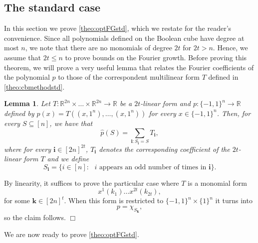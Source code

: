 \documentclass[11pt]{article}
\newcommand{\R}{\mathbb{R}} %
\newcommand{\1}{\mathbf{1}}
\newcommand{\ind}[1]{\mathbf{#1}}
\theoremstyle{plain}
\newtheorem{lemma}[theorem]{Lemma}
\theoremstyle{definition}
\theoremstyle{remark}
\renewenvironment{proof}[1][]{
    	\begin{trivlist}
     	\item[\hspace{\labelsep}{\em\noindent Proof#1:\/}]}
     	{{\hfill$\Box$}
    	\end{trivlist}
  }
\begin{document}
\subsection{The standard case}
In this section we prove \cref{theo:optFGstd}, which we restate for the reader's convenience. Since all polynomials defined on the Boolean cube have degree at most $n$, we note that there are no monomials of degree $2t$ for $2t>n$. Hence, we assume that $2t\leq n$ to prove bounds on the Fourier growth.
\theooptFGstd*
Before proving this theorem, we will prove a very useful lemma that relates the Fourier coefficients of the polynomial $p$ to those of the correspondent multilinear form $T$ defined in \cref{theo:cbmethodstd}.
\begin{lemma}\label{lemma:2}
 Let $T:\mathbb R^{2n}\times\dots\times\R^{2n}\to \R$ be a $2t$-linear form and $p:\{-1,1\}^n\to \R$ defined by $p(x)=T((x,1^n), \dots,(x,1^n))$  for every $x\in\{-1,1\}^n$. Then, for every $S\subseteq [n]$, we have that 
    \begin{equation*}
        \widehat p(S)= \sum_{\ind i:S_{\ind i}=S}T_{\ind i},
    \end{equation*}where for every $\ind i\in [2n]^{2t}$, $T_{\ind i}$ denotes the corresponding coefficient of the $2t$-linear form $T$ and we define  $$S_{\ind i}=\{i\in [n]:\text{ $i$ appears an odd number of times in }\ind i\}.$$
    \end{lemma}
    \begin{proof}
        By linearity, it suffices to prove the particular case where $T$ is a monomial form $$x^1(k_1)\dots x^{2t}(k_{2t}),$$ for some $\ind k\in [2n]^t$. When this form is restricted to $\{-1,1\}^n\times \{1\}^n$ it turns into 
        \begin{equation*}
            p=\chi_{S_{\ind k}},
        \end{equation*}
        so the claim follows.
    \end{proof}

    We are now ready to prove \cref{theo:optFGstd}.
\end{document}
